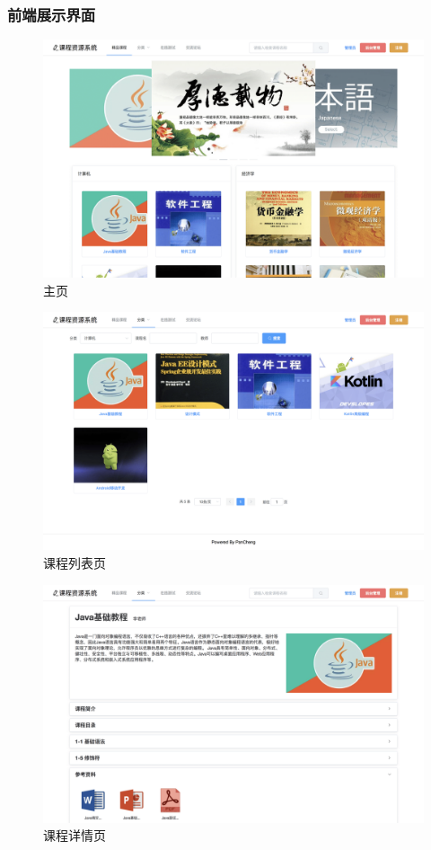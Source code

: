 \documentclass[titlepage,UTF8,linespread=1.5]{ctexart}
\begin{document}
\subsubsection{前端展示界面}
\begin{figure}[H]
    \centering
    \includegraphics[width=140mm]{view-home.png}
    \caption{主页}
    \label{fig:view-home}
\end{figure}
\begin{figure}[H]
    \centering
    \includegraphics[width=140mm]{view-course-list.png}
    \caption{课程列表页}
    \label{fig:view-course-list}
\end{figure}
\begin{figure}[H]
    \centering
    \includegraphics[width=140mm]{view-course.png}
    \caption{课程详情页}
    \label{fig:view-course}
\end{figure}
\end{document}
